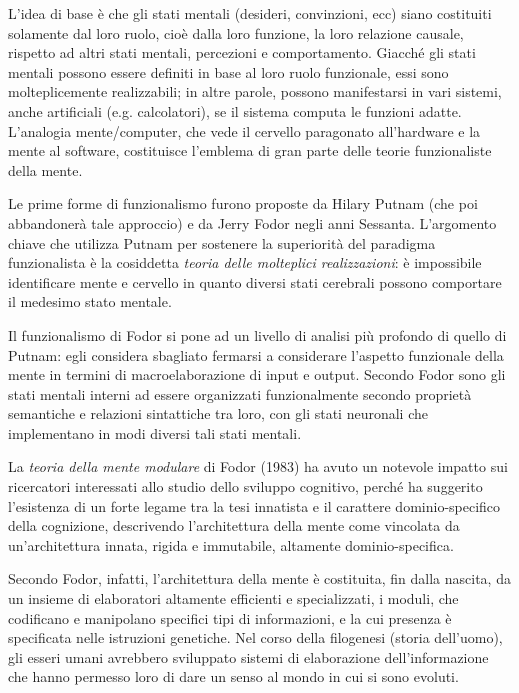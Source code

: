 L'idea di base è che gli stati mentali (desideri, convinzioni, ecc) siano costituiti solamente dal loro ruolo, cioè dalla loro funzione, la loro relazione causale, rispetto ad altri stati mentali, percezioni e comportamento. Giacché gli stati mentali possono essere definiti in base al loro ruolo funzionale, essi sono molteplicemente realizzabili; in altre parole, possono manifestarsi in vari sistemi, anche artificiali (e.g. calcolatori), se il sistema computa le funzioni adatte. L'analogia mente/computer, che vede il cervello paragonato all'hardware e la mente al software, costituisce l'emblema di gran parte delle teorie funzionaliste della mente.

Le prime forme di funzionalismo furono proposte da Hilary Putnam (che poi abbandonerà tale approccio) e da Jerry Fodor negli anni Sessanta. L'argomento chiave che utilizza Putnam per sostenere la superiorità del paradigma funzionalista è la cosiddetta \emph{teoria delle molteplici realizzazioni}: è impossibile identificare mente e cervello in quanto diversi stati cerebrali possono comportare il medesimo stato mentale.

Il funzionalismo di Fodor si pone ad un livello di analisi più profondo di quello di Putnam: egli considera sbagliato fermarsi a considerare l'aspetto funzionale della mente in termini di macroelaborazione di input e output. Secondo Fodor sono gli stati mentali interni ad essere organizzati funzionalmente secondo proprietà semantiche e relazioni sintattiche tra loro, con gli stati neuronali che implementano in modi diversi tali stati mentali.

La \emph{teoria della mente modulare} di Fodor (1983) ha avuto un notevole impatto sui ricercatori interessati allo studio dello sviluppo cognitivo, perché ha suggerito l'esistenza di un forte legame tra la tesi innatista e il carattere dominio-specifico della cognizione, descrivendo l'architettura della mente come vincolata da un'architettura innata, rigida e immutabile, altamente dominio-specifica.

Secondo Fodor, infatti, l'architettura della mente è costituita, fin dalla nascita, da un insieme di elaboratori altamente efficienti e specializzati, i moduli, che codificano e manipolano specifici tipi di informazioni, e la cui presenza è specificata nelle istruzioni genetiche. Nel corso della filogenesi (storia dell’uomo), gli esseri umani avrebbero sviluppato sistemi di elaborazione dell'informazione che hanno permesso loro di dare un senso al mondo in cui si sono evoluti.

